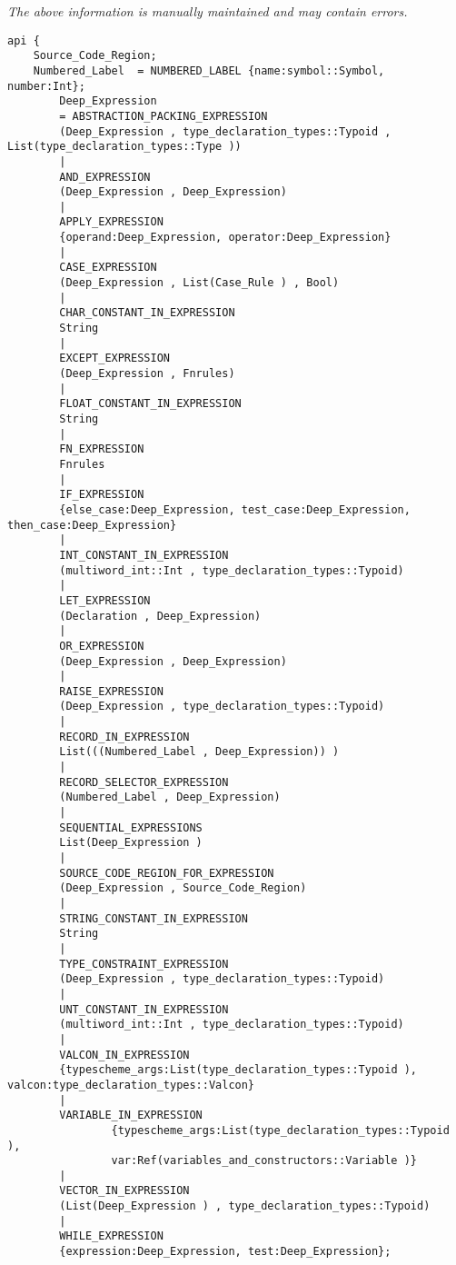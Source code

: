 \label{api:Deep\_Syntax}

{\tiny \it The above information is manually maintained and may contain errors.}
\begin{verbatim}
api {
    Source_Code_Region;
    Numbered_Label  = NUMBERED_LABEL {name:symbol::Symbol, number:Int};
        Deep_Expression
        = ABSTRACTION_PACKING_EXPRESSION
        (Deep_Expression , type_declaration_types::Typoid , List(type_declaration_types::Type ))
        |
        AND_EXPRESSION
        (Deep_Expression , Deep_Expression)
        |
        APPLY_EXPRESSION
        {operand:Deep_Expression, operator:Deep_Expression}
        |
        CASE_EXPRESSION
        (Deep_Expression , List(Case_Rule ) , Bool)
        |
        CHAR_CONSTANT_IN_EXPRESSION
        String
        |
        EXCEPT_EXPRESSION
        (Deep_Expression , Fnrules)
        |
        FLOAT_CONSTANT_IN_EXPRESSION
        String
        |
        FN_EXPRESSION
        Fnrules
        |
        IF_EXPRESSION
        {else_case:Deep_Expression, test_case:Deep_Expression, then_case:Deep_Expression}
        |
        INT_CONSTANT_IN_EXPRESSION
        (multiword_int::Int , type_declaration_types::Typoid)
        |
        LET_EXPRESSION
        (Declaration , Deep_Expression)
        |
        OR_EXPRESSION
        (Deep_Expression , Deep_Expression)
        |
        RAISE_EXPRESSION
        (Deep_Expression , type_declaration_types::Typoid)
        |
        RECORD_IN_EXPRESSION
        List(((Numbered_Label , Deep_Expression)) )
        |
        RECORD_SELECTOR_EXPRESSION
        (Numbered_Label , Deep_Expression)
        |
        SEQUENTIAL_EXPRESSIONS
        List(Deep_Expression )
        |
        SOURCE_CODE_REGION_FOR_EXPRESSION
        (Deep_Expression , Source_Code_Region)
        |
        STRING_CONSTANT_IN_EXPRESSION
        String
        |
        TYPE_CONSTRAINT_EXPRESSION
        (Deep_Expression , type_declaration_types::Typoid)
        |
        UNT_CONSTANT_IN_EXPRESSION
        (multiword_int::Int , type_declaration_types::Typoid)
        |
        VALCON_IN_EXPRESSION
        {typescheme_args:List(type_declaration_types::Typoid ), valcon:type_declaration_types::Valcon}
        |
        VARIABLE_IN_EXPRESSION
                {typescheme_args:List(type_declaration_types::Typoid ),
                var:Ref(variables_and_constructors::Variable )}
        |
        VECTOR_IN_EXPRESSION
        (List(Deep_Expression ) , type_declaration_types::Typoid)
        |
        WHILE_EXPRESSION
        {expression:Deep_Expression, test:Deep_Expression};

\end{verbatim}
